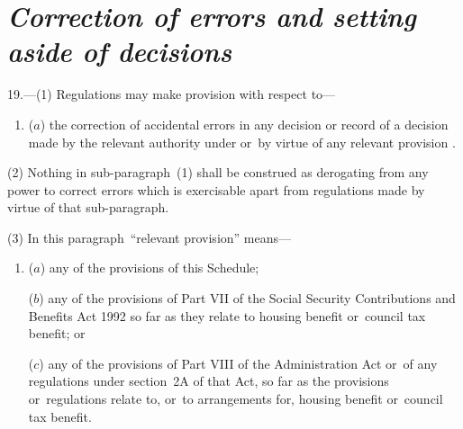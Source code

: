 \documentclass[12pt,a4paper]{article}
\begin{document}

\section*{\itshape Correction of errors and setting aside of decisions}

19.---(1) Regulations may make provision with respect to—
\begin{enumerate}\item[]
($a$) the correction of accidental errors in any decision or record of a decision made 
by the relevant authority  %
under or~by virtue of any relevant provision%
%
%
.
\end{enumerate}

(2) Nothing in sub-paragraph~(1)  shall be construed as derogating from any power to correct errors 
which is exercisable apart from regulations made by virtue of that sub-paragraph.

(3) In this paragraph~“relevant provision” means—
\begin{enumerate}\item[]
($a$) any of the provisions of this Schedule;

($b$) any of the provisions of Part VII of the Social Security Contributions and Benefits Act 1992 so far as they relate to housing benefit or~council tax benefit; or

($c$) any of the provisions of Part VIII of the Administration Act or~of any regulations under section~2A of that Act, so far as the provisions or~regulations relate to, or~to arrangements for, housing benefit or~council tax benefit.
\end{enumerate}
\end{document}
